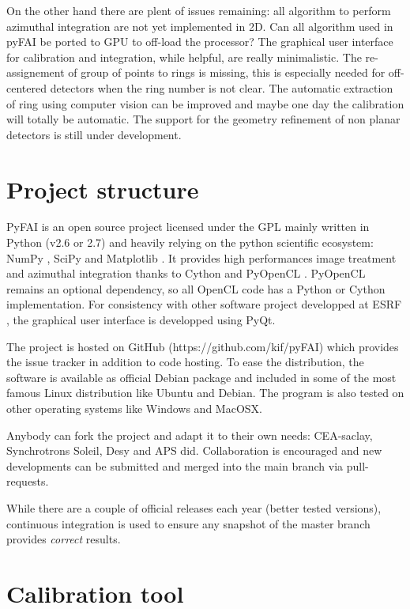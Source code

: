 \documentclass[preprint]{iucr}
\begin{document}
On the other hand there are plent of issues remaining: all algorithm to perform
azimuthal integration are not yet implemented in 2D. Can all algorithm used in
pyFAI be ported to GPU to off-load the processor? The graphical user interface
for calibration and integration, while helpful, are really minimalistic.
The re-assignement of group of points to rings is missing, this is
especially needed for off-centered detectors when the ring number is not clear.
The automatic extraction of ring using computer vision can be improved and maybe
one day the calibration will totally be automatic.
The support for the geometry refinement of non planar detectors is
still under development.




\appendix
\section{Project structure}
PyFAI is an open source project licensed under the GPL mainly written in Python (v2.6 or 2.7)
and heavily relying on the python scientific ecosystem: NumPy \cite{numpy},
SciPy \cite{scipy} and Matplotlib \cite{matplotlib}.
It provides high performances image treatment and azimuthal integration thanks
to Cython \cite{cython} and PyOpenCL \cite{pyopencl}.
PyOpenCL remains an optional dependency, so all OpenCL code has a
Python or Cython implementation.
For consistency with other software project developped at ESRF \cite{pymca},
the graphical user interface is developped using PyQt.

The project is hosted on GitHub (https://github.com/kif/pyFAI) which provides
the issue tracker in addition to code hosting.
To ease the distribution, the
software is available as official Debian package and included in some of the
most famous Linux distribution like Ubuntu and Debian.
The program is also tested on other operating systems like Windows and
MacOSX.

Anybody can fork the project and adapt it to their own needs: CEA-saclay,
Synchrotrons Soleil, Desy and APS did. Collaboration is encouraged and
new developments can be submitted and merged into the main branch
via pull-requests.

While there are a couple of official releases each year (better
tested versions), continuous integration is used to ensure any snapshot of the
master branch provides \textit{correct} results.

\section{Calibration tool}
\label{annex_calib}
\end{document}
